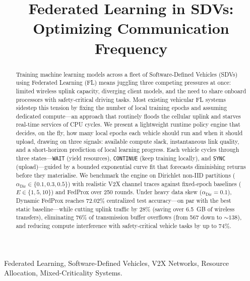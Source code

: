 \documentclass[conference]{IEEEtran}
\begin{document}
\title{Federated Learning in SDVs: Optimizing Communication Frequency}

\author{
}

\maketitle

\begin{abstract}
Training machine learning models across a fleet of Software-Defined Vehicles (SDVs) using Federated Learning (FL) means juggling three competing pressures at once: limited wireless uplink capacity, diverging client models, and the need to share onboard processors with safety-critical driving tasks. Most existing vehicular FL systems sidestep this tension by fixing the number of local training epochs and assuming dedicated compute---an approach that routinely floods the cellular uplink and starves real-time services of CPU cycles. We present a lightweight runtime policy engine that decides, on the fly, how many local epochs each vehicle should run and when it should upload, drawing on three signals: available compute slack, instantaneous link quality, and a short-horizon prediction of local learning progress. Each vehicle cycles through three states---\texttt{WAIT} (yield resources), \texttt{CONTINUE} (keep training locally), and \texttt{SYNC} (upload)---guided by a bounded exponential curve fit that forecasts diminishing returns before they materialise. We benchmark the engine on Dirichlet non-IID partitions ($\alpha_{\text{Dir}} \in \{0.1, 0.3, 0.5\}$) with realistic V2X channel traces against fixed-epoch baselines ($E \in \{1, 5, 10\}$) and FedProx over 250 rounds. Under heavy data skew ($\alpha_{\text{Dir}} = 0.1$), Dynamic FedProx reaches 72.02\% centralized test accuracy---on par with the best static baseline---while cutting uplink traffic by 28\% (saving over 6.5~GB of wireless transfers), eliminating 76\% of transmission buffer overflows (from 567 down to ${\sim}138$), and reducing compute interference with safety-critical vehicle tasks by up to 74\%.
\end{abstract}

\begin{IEEEkeywords}
Federated Learning, Software-Defined Vehicles, V2X Networks, Resource Allocation, Mixed-Criticality Systems.
\end{IEEEkeywords}
\end{document}
